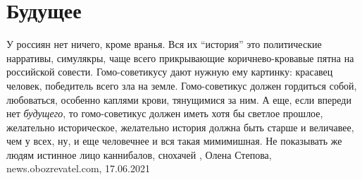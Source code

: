  
 
 
 
 
\chapter{Будущее}

У россиян нет ничего, кроме вранья. Вся их \enquote{история} это политические
нарративы, симулякры, чаще всего прикрывающие коричнево-кровавые пятна на
российской совести. Гомо-советикусу дают нужную ему картинку: красавец человек,
победитель всего зла на земле. Гомо-советикус должен гордиться собой,
любоваться, особенно каплями крови, тянущимися за ним.  А еще, если впереди нет
\emph{будущего}, то гомо-советикус должен иметь хотя бы светлое прошлое, желательно
историческое, желательно история должна быть старше и величавее, чем у всех,
ну, и еще человечнее и вся такая мимимишная. Не показывать же людям истинное
лицо каннибалов, снохачей
, 
Олена Степова, news.obozrevatel.com, 17.06.2021

